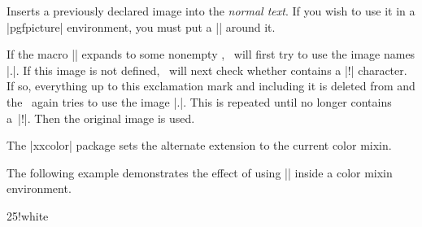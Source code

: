 \begin{command}{\pgfuseimage{}}
  Inserts a previously declared image into the \emph{normal text}. If
  you wish to use it in a |{pgfpicture}| environment, you must put a
  |\pgftext| around it.

  If the macro |\pgfalternateextension| expands to some nonempty
  , \pgfname\ will first try to use the image
  names |.|. If this
  image is not defined, \pgfname\ will next check whether  contains a |!| character. If so, everything up to this
  exclamation mark and including it is deleted from  and the \pgfname\ again tries to use the image |.|. This is repeated until
   no longer contains a~|!|. Then the
  original image is used.

  The |xxcolor| package sets the alternate extension to the current
  color mixin. 

\begin{codeexample}[]
\begin{pgfpicture}

  \pgfpathrectangle{\pgfpoint{1cm}{5cm}}{\pgfpoint{1cm}{1cm}}
  \pgfpathrectangle{\pgfpoint{1cm}{3cm}}{\pgfpoint{1cm}{1cm}}
  \pgfpathrectangle{\pgfpoint{1cm}{1cm}}{\pgfpoint{1cm}{1cm}}
\end{pgfpicture}
\end{codeexample}

  The following example demonstrates the effect of using
  |\pgfuseimage| inside a color mixin environment.

\begin{codeexample}[]
\begin{colormixin}{25!white}
\begin{pgfpicture}

  \pgfpathrectangle{\pgfpoint{1cm}{5cm}}{\pgfpoint{1cm}{1cm}}
  \pgfpathrectangle{\pgfpoint{1cm}{3cm}}{\pgfpoint{1cm}{1cm}}
  \pgfpathrectangle{\pgfpoint{1cm}{1cm}}{\pgfpoint{1cm}{1cm}}
\end{pgfpicture}
\end{colormixin}
\end{codeexample}
\end{command}

